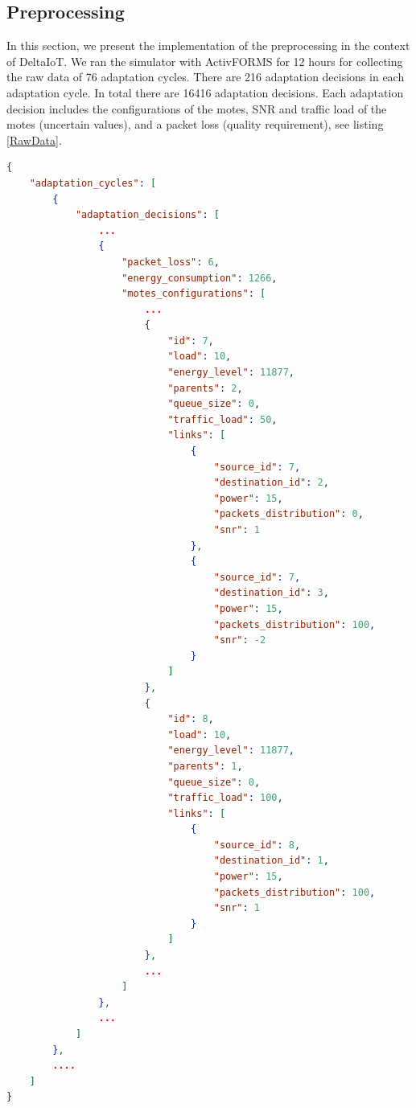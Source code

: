 \documentclass[a4paper,12pt]{article}
\begin{document}
\subsection{Preprocessing}
In this section, we present the implementation of the preprocessing in the context of DeltaIoT. We ran the simulator with ActivFORMS for 12 hours for collecting the raw data of 76 adaptation cycles. There are 216 adaptation decisions in each adaptation cycle. In total there are 16416 adaptation decisions. Each adaptation decision includes the configurations of the motes, SNR and traffic load of the motes (uncertain values), and a packet loss (quality requirement), see listing \ref{RawData}.
\begin{lstlisting}[language=json, caption=An overview of the raw data, label=RawData]
{
	"adaptation_cycles": [
		{
			"adaptation_decisions": [
				...
				{
					"packet_loss": 6,
					"energy_consumption": 1266,
					"motes_configurations": [
						...
						{
							"id": 7,
							"load": 10,
							"energy_level": 11877,
							"parents": 2,
							"queue_size": 0,
							"traffic_load": 50,
							"links": [
								{
									"source_id": 7,
									"destination_id": 2,
									"power": 15,
									"packets_distribution": 0,
									"snr": 1
								},
								{
									"source_id": 7,
									"destination_id": 3,
									"power": 15,
									"packets_distribution": 100,
									"snr": -2
								}
							]
						},
						{
							"id": 8,
							"load": 10,
							"energy_level": 11877,
							"parents": 1,
							"queue_size": 0,
							"traffic_load": 100,
							"links": [
								{
									"source_id": 8,
									"destination_id": 1,
									"power": 15,
									"packets_distribution": 100,
									"snr": 1
								}
							]
						},
						...
					]
				},
				...
			]
		},
		....
	]
}
\end{lstlisting}
\end{document}
